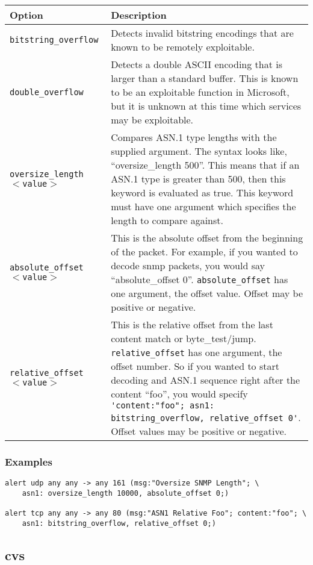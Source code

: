 \documentclass[english]{report}
\begin{document}
\begin{tabular}{| l | p{5in} |}
\hline
{\bf Option} & {\bf Description}\\
\hline
\hline
\texttt{bitstring\_overflow} & Detects invalid bitstring encodings that are known to be remotely exploitable. \\
\hline
\texttt{double\_overflow} & Detects a double ASCII encoding that is larger than a standard buffer.  This is known to be an exploitable function in Microsoft, but it is unknown at this time which services may be exploitable. \\
\hline
\texttt{oversize\_length $<$value$>$} & Compares ASN.1 type lengths with the supplied argument.  The syntax looks like, ``oversize\_length 500''.  This means that if an ASN.1 type is greater than 500, then this keyword is evaluated as true.  This keyword must have one argument which specifies the length to compare against. \\
\hline
\texttt{absolute\_offset $<$value$>$} & This is the absolute offset from the beginning of the packet.  For example, if you wanted to decode snmp packets, you would say ``absolute\_offset 0''.  \texttt{absolute\_offset} has one argument, the offset value.  Offset may be positive or negative. \\  
\hline
\texttt{relative\_offset $<$value$>$} & This is the relative offset from the last content match or byte\_test/jump.  \texttt{relative\_offset} has one argument, the offset number.  So if you wanted to start decoding and ASN.1 sequence right after the content ``foo'', you would specify \verb!'content:"foo"; asn1: bitstring_overflow, relative_offset 0'!.  Offset values may be positive or negative. \\ 
\hline
\end{tabular}

\subsubsection{Examples}

\begin{verbatim}
alert udp any any -> any 161 (msg:"Oversize SNMP Length"; \
    asn1: oversize_length 10000, absolute_offset 0;)
    
alert tcp any any -> any 80 (msg:"ASN1 Relative Foo"; content:"foo"; \
    asn1: bitstring_overflow, relative_offset 0;)
\end{verbatim}

\subsection{cvs}
\end{document}
